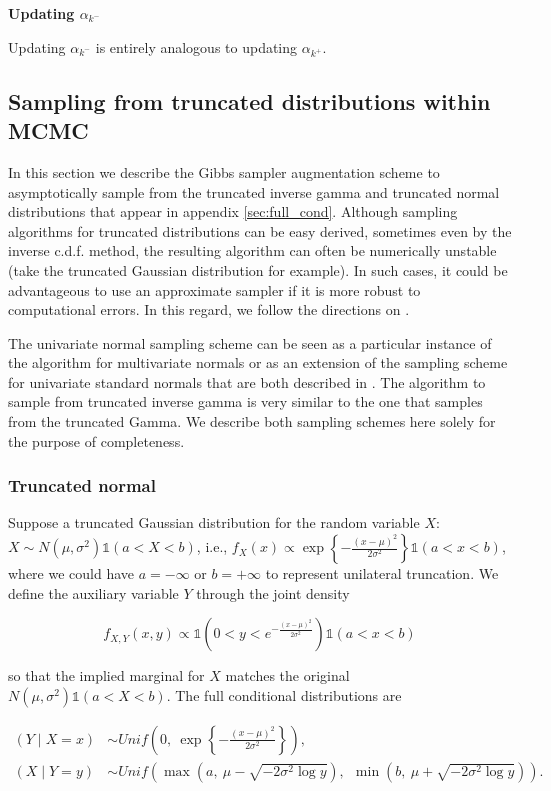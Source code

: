 \textbf{Updating $\alpha_{k^-}$}

Updating $\alpha_{k^-}$ is entirely analogous to updating $\alpha_{k^+}$.

\subsection{Sampling from truncated distributions within MCMC}
\label{sec:trunc_dists}

In this section we describe the Gibbs sampler augmentation scheme to asymptotically sample from the truncated inverse gamma and truncated normal distributions that appear in appendix \ref{sec:full_cond}. Although sampling algorithms for truncated distributions can be easy derived, sometimes even by the inverse c.d.f. method, the resulting algorithm can often be numerically unstable (take the truncated Gaussian distribution for example). In such cases, it could be advantageous to use an approximate sampler if it is more robust to computational errors. In this regard, we follow the directions on \cite{damien2001}. 

The univariate normal sampling scheme can be seen as a particular instance of the algorithm for multivariate normals or as an extension of the sampling scheme for univariate standard normals that are both described in \cite{damien2001}. The algorithm to sample from truncated inverse gamma is very similar to the one that samples from the truncated Gamma. We describe both sampling schemes here solely for the purpose of completeness.


\subsubsection{Truncated normal}

Suppose a truncated Gaussian distribution for the random variable $X$: $X\sim N(\mu, \sigma^2)\mathds{1}(a < X < b)$, i.e., $f_{X}(x) \propto \exp\left\{-\frac{(x - \mu)^2}{2 \sigma^2} \right\}\mathds{1}(a < x<b)$, where we could have $a=-\infty$ or $b=+\infty$ to represent unilateral truncation. We define the auxiliary variable $Y$ through the joint density

$$f_{X,Y}(x, y) \propto \mathds{1}(0<y<e^{-\frac{(x-\mu)^2}{2\sigma^2}})\mathds{1}(a<x<b)$$

\noindent so that the implied marginal for $X$ matches the original $N(\mu, \sigma^2)\mathds{1}(a < X < b)$. The full conditional distributions are 

\begin{align}
(Y\mid X=x) &\sim Unif\left(0, \ \exp\left\{-\frac{(x - \mu)^2}{2\sigma^2}\right\}\right),\label{eq:trunc_normal_1}\\
(X \mid Y=y) &\sim Unif\left(\max (a, \ \mu - \sqrt{-2\sigma^2\log y}), \ \ \min (b, \ \mu + \sqrt{-2\sigma^2\log y})\right).\label{eq:trunc_normal_2}
\end{align}

